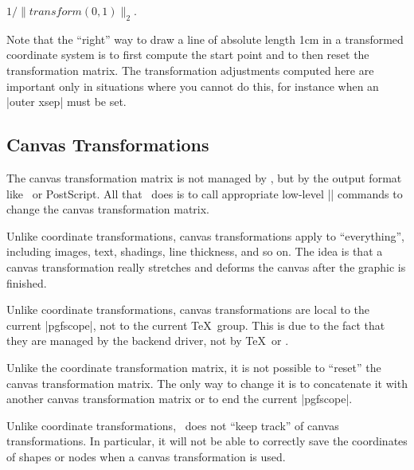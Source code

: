\begin{command}{\pgftransformationadjustments}
\begin{command}{\pgfhorizontaltransformationadjustment}
\begin{codeexample}[]
\end{codeexample}
    \end{command}
    \begin{command}{\pgfverticaltransformationadjustment}
        $1/\|\mathit{transform}(0,1)\|_2$.
    \end{command}

    Note that the ``right'' way to draw a line of absolute length 1cm in a
    transformed coordinate system is to first compute the start point and to
    then reset the transformation matrix. The transformation adjustments
    computed here are important only in situations where you cannot do this,
    for instance when an |outer xsep| must be set.
\end{command}


\subsection{Canvas Transformations}

The canvas transformation matrix is not managed by \pgfname, but by the output
format like \pdf\ or PostScript. All that \pgfname\ does is to call appropriate
low-level |\pgfsys@| commands to change the canvas transformation matrix.

Unlike coordinate transformations, canvas transformations apply to
``everything'', including images, text, shadings, line thickness, and so on.
The idea is that a canvas transformation really stretches and deforms the
canvas after the graphic is finished.

Unlike coordinate transformations, canvas transformations are local to the
current |{pgfscope}|, not to the current \TeX\ group. This is due to the fact
that they are managed by the backend driver, not by \TeX\ or \pgfname.

Unlike the coordinate transformation matrix, it is not possible to ``reset''
the canvas transformation matrix. The only way to change it is to concatenate
it with another canvas transformation matrix or to end the current
|{pgfscope}|.

Unlike coordinate transformations, \pgfname\ does not ``keep track'' of canvas
transformations. In particular, it will not be able to correctly save the
coordinates of shapes or nodes when a canvas transformation is used.


